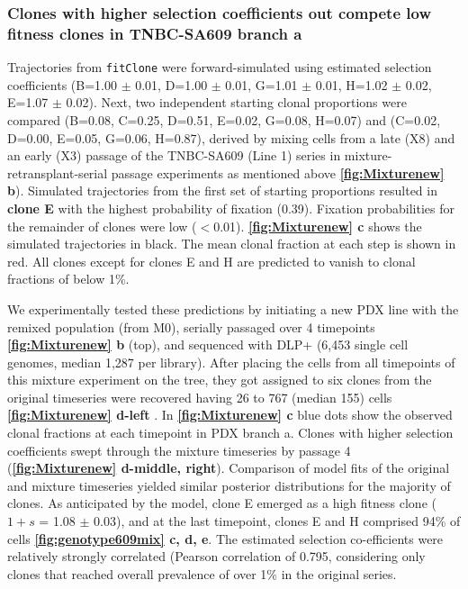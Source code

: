 \subsubsection{Clones with higher selection coefficients out compete low fitness clones in TNBC-SA609 branch a}
 Trajectories from \texttt{fitClone} were forward-simulated using estimated selection coefficients (B=1.00 $\pm$ 0.01, D=1.00 $\pm$ 0.01, G=1.01 $\pm$ 0.01, H=1.02 $\pm$ 0.02, E=1.07 $\pm$ 0.02). Next, two independent starting clonal proportions were compared (B=0.08, C=0.25, D=0.51, E=0.02, G=0.08, H=0.07) and (C=0.02, D=0.00, E=0.05, G=0.06, H=0.87), derived by mixing cells from a late (X8) and an early (X3) passage of the TNBC-SA609 (Line 1) series in mixture-retransplant-serial passage experiments as mentioned above \textbf{\autoref{fig:Mixturenew} b}). Simulated trajectories from the first set of starting proportions resulted in \textbf{clone E} with the highest probability of fixation (0.39). Fixation probabilities for the remainder of clones were low ($<$0.01). \textbf{\autoref{fig:Mixturenew} c} shows the simulated trajectories in black.
The mean clonal fraction at each step is shown in red. All clones except for clones E and H are predicted to vanish to clonal fractions of below 1\%. 


We experimentally tested these predictions by initiating a new PDX line with the remixed population (from M0), serially passaged over 4 timepoints \textbf{\autoref{fig:Mixturenew} b} (top), and sequenced with DLP+ (6,453 single cell genomes, median 1,287 per library). After placing the cells from all timepoints of this mixture experiment on the tree, they got assigned to six clones from the original timeseries were recovered having 26 to 767 (median 155) cells \textbf{\autoref{fig:Mixturenew} d-left} . In \textbf{\autoref{fig:Mixturenew} c} blue dots show the observed clonal fractions at each timepoint in PDX branch a. Clones with higher selection coefficients swept through the mixture timeseries by passage 4 (\textbf{\autoref{fig:Mixturenew} d-middle, right}). Comparison of model fits of the original and mixture timeseries yielded similar posterior distributions for the majority of clones. As anticipated by the model, clone E emerged as a high fitness clone ($1+s$ = 1.08  $\pm$ 0.03), and at the last timepoint, clones E and H comprised 94\% of cells \textbf{\autoref{fig:genotype609mix} c, d, e}. 
The estimated selection co-efficients were relatively strongly correlated (Pearson correlation of 0.795, considering only clones that reached overall prevalence of over 1\% in the original series.

